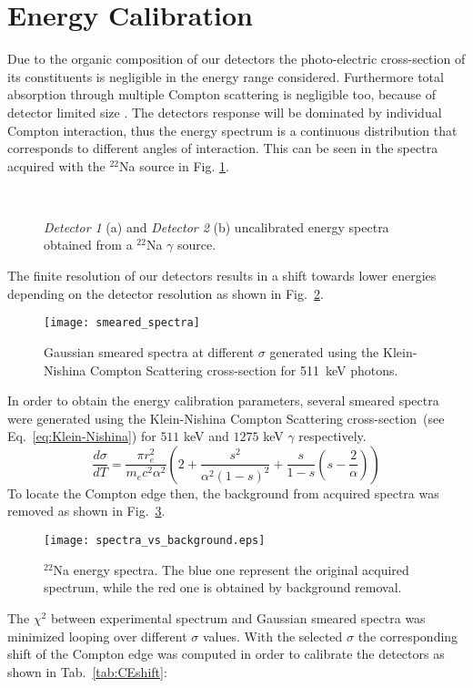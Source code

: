 
\section*{Energy Calibration}

Due to the organic composition of our detectors the photo-electric cross-section of its constituents is negligible in the energy range considered. Furthermore total absorption through multiple Compton scattering is negligible too, because of detector limited size . The detectors response will be dominated by individual Compton interaction, thus the energy spectrum is a continuous distribution that corresponds to different angles of interaction. This can be seen in the spectra acquired with the $^{22}$Na source in Fig. \ref{fig: uncalibrated energy spectra}.

\smallskip
\begin{figure}[h!]
\centering
{} \quad
{} \\
\caption{\emph{Detector 1} (a) and \emph{Detector 2} (b) uncalibrated energy spectra  obtained from a $^{22}$Na $\gamma$ source.}
\label{fig: uncalibrated energy spectra}
\end{figure}

The finite resolution of our detectors results in a shift towards lower energies depending on the detector resolution as shown in Fig.~\ref{fig: smeared spectra}.
\begin{figure}[h!]
\centering
\texttt{[image: smeared\_spectra]}
\caption{Gaussian smeared spectra at different $\sigma$ generated using the  Klein-Nishina Compton Scattering cross-section  for 511~keV photons.}
\label{fig: smeared spectra}
\end{figure}

In order to obtain the energy calibration parameters, several smeared spectra were generated using the  Klein-Nishina Compton Scattering cross-section~(see Eq.~\ref{eq:Klein-Nishina}) for $511$ keV and $1275$ keV $\gamma$ respectively.
\begin{equation}
\dfrac{d\sigma}{dT} = \dfrac{\pi r_e^2}{m_ec^2\alpha^2}\left(2+\dfrac{s^2}{\alpha^2(1-s)^2}+\dfrac{s}{1-s} \left(s-\dfrac{2}{\alpha}\right) \right)
\label{eq:Klein-Nishina}
\end{equation}
To locate the Compton edge then, the background from acquired spectra was removed  as shown in Fig.~\ref{fig: compton back}.
\begin{figure}[h!]
\centering
\texttt{[image: spectra\_vs\_background.eps]}
\caption{$^{22}$Na energy spectra. The blue one represent the original acquired spectrum, while the red one is obtained by background removal.}
\label{fig: compton back}
\end{figure}
The $\chi^2$ between experimental spectrum and Gaussian smeared spectra was minimized looping over different $\sigma$ values. With the selected $\sigma$ the corresponding shift of the Compton edge was computed in order to calibrate the detectors as shown in Tab.~\ref{tab:CEshift}:

